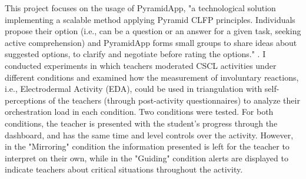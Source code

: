 This project focuses on the usage of PyramidApp, "a technological solution implementing a scalable method applying Pyramid CLFP principles. Individuals propose their option (i.e., can be a question or an answer for a given task, seeking active comprehension) and PyramidApp forms small groups to share ideas about suggested options, to clarify and negotiate before rating the options." \cite{Manathunga2016-gy}. I conducted experiments in which teachers moderated CSCL activities under different conditions and examined how the measurement of involuntary reactions, i.e., Electrodermal Activity (EDA), could be used in triangulation with self-perceptions of the teachers (through post-activity questionnaires) to analyze their orchestration load in each condition. Two conditions were tested. For both conditions, the teacher is presented with the student's progress through the dashboard, and has the same time and level controls over the activity. However, in the "Mirroring" condition the information presented is left for the teacher to interpret on their own, while in the "Guiding" condition alerts are displayed to indicate teachers about critical situations throughout the activity. 